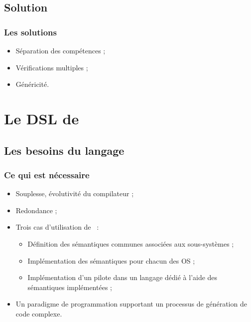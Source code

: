 \documentclass[]{beamer}
\begin{document}
\subsection{Solution}
\begin{frame}
\frametitle{Les solutions}
\begin{itemize}[<+->]
    \item Séparation des compétences ;
    \item Vérifications multiples ;
    \item Généricité.
\end{itemize}
\end{frame}



\section{Le DSL de \rtx}

\subsection{Les besoins du langage}
\begin{frame}
\frametitle{Ce qui est nécessaire}
\begin{itemize}[<+->]
    \item Souplesse, évolutivité du compilateur ;
    \item Redondance ;
    \item Trois cas d'utilisation de \rtx\ :
        \begin{itemize}
            \item Définition des sémantiques communes associées aux
                  sous-systèmes ;
            \item Implémentation des sémantiques pour chacun des OS ;
            \item Implémentation d'un pilote dans un langage dédié à l'aide des
                  sémantiques implémentées ;
        \end{itemize}
    \item Un paradigme de programmation supportant un processus de génération
          de code complexe.
\end{itemize}
\end{frame}
\end{document}
